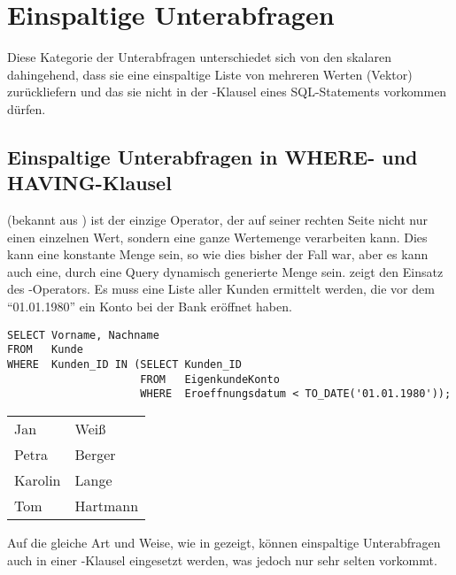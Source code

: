     \section{Einspaltige Unterabfragen}
      Diese Kategorie der Unterabfragen unterschiedet sich von den skalaren dahingehend, dass sie eine einspaltige Liste von mehreren Werten (Vektor) zurückliefern und das sie nicht in der \SELECT-Klausel eines SQL-Statements vorkommen dürfen.
      \subsection{Einspaltige Unterabfragen in WHERE- und HAVING-Klausel}
         (bekannt aus ) ist der einzige Operator, der auf seiner rechten Seite nicht nur einen einzelnen Wert, sondern eine ganze Wertemenge verarbeiten kann. Dies kann eine konstante Menge sein, so wie dies bisher der Fall war, aber es kann auch eine, durch eine Query dynamisch generierte Menge sein.  zeigt den Einsatz des -Operators. Es muss eine Liste aller Kunden ermittelt werden, die vor dem \enquote{01.01.1980} ein Konto bei der Bank eröffnet haben.
        \begin{lstlisting}[language=oracle_sql,caption={\languageorasql{IN} mit Unterabfrage},label=sql06_07]
SELECT Vorname, Nachname
FROM   Kunde
WHERE  Kunden_ID IN (SELECT Kunden_ID
                     FROM   EigenkundeKonto
                     WHERE  Eroeffnungsdatum < TO_DATE('01.01.1980'));
        \end{lstlisting}
        \begin{center}
          \begin{small}
            \tablehead{}
            \begin{msoraclesql}
              \begin{supertabular}{ll}
									Jan & Weiß \\
									Petra & Berger \\
									Karolin & Lange \\
									Tom & Hartmann \\
								\end{supertabular}
            \end{msoraclesql}
          \end{small}
        \end{center}
        Auf die gleiche Art und Weise, wie in  gezeigt, können einspaltige Unterabfragen auch in einer \HAVING-Klausel eingesetzt werden, was jedoch nur sehr selten vorkommt.
